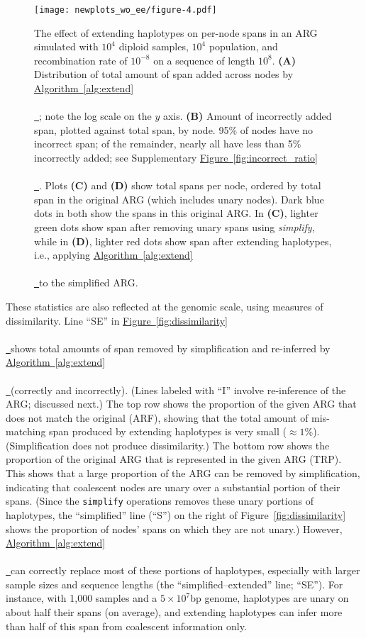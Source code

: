 \documentclass[10pt,twoside,lineno]{gsajnl}
\newcommand{\algorithmref}[2][]{%
	\hyperref[{#2}]{%
		Algorithm~\ref*{#2}%
		\ifx\\#1\\%
		\else
		\,#1%
		\fi
	}%
}
\newcommand*{\figref}[2][]{%
	\hyperref[{#2}]{%
		Figure~\ref*{#2}%
		\ifx\\#1\\%
		\else
		\,#1%
		\fi
	}%
}
\begin{document}
\begin{figure}[!bht]
	\texttt{[image: newplots\_wo\_ee/figure-4.pdf]}
	\caption{
        The effect of extending haplotypes on per-node spans
        in an ARG simulated with $10^4$ diploid samples, $10^4$ population, and 
        recombination rate of $10^{-8}$ on a sequence of length $10^8$.
        \textbf{(A)}
        Distribution of total amount of span added across nodes by \algorithmref{alg:extend};
        note the log scale on the $y$ axis.
        \textbf{(B)}
        Amount of incorrectly added span, plotted against total span, by node.
        95\% of nodes have no incorrect span; of the remainder,
        nearly all have less than 5\% incorrectly added;
        see Supplementary \figref{fig:incorrect_ratio}.
        Plots \textbf{(C)} and \textbf{(D)} show total spans per node,
        ordered by total span in the original ARG (which includes unary nodes).
        Dark blue dots in both show the spans in this original ARG.
        In \textbf{(C)}, lighter green dots show
        span after removing unary spans using \textit{simplify},
        while in \textbf{(D)},
        lighter red dots show span after extending haplotypes,
        i.e., applying \algorithmref{alg:extend} to the simplified ARG.
    }
	\label{fig:node-spans}
\end{figure}

These statistics are also reflected at the genomic scale, using measures of dissimilarity.
Line ``SE'' in \figref{fig:dissimilarity} shows total amounts of span removed by simplification
and re-inferred by \algorithmref{alg:extend} (correctly and incorrectly).
(Lines labeled with ``I'' involve re-inference of the ARG; discussed next.)
The top row shows the proportion of the given ARG that does not match the original (ARF),
showing that the total amount of mis-matching span
produced by extending haplotypes is very small ($\approx 1\%$).
(Simplification does not produce dissimilarity.)
The bottom row shows the proportion of the original ARG that is represented in the given ARG (TRP).
This shows that a large proportion of the ARG can be removed by simplification,
indicating that coalescent nodes are unary
over a substantial portion of their spans.
(Since the \texttt{simplify} operations removes these unary portions of haplotypes,
the ``simplified'' line (``S'') on the right of Figure~\ref{fig:dissimilarity} shows
the proportion of nodes' spans on which they are not unary.)
However, \algorithmref{alg:extend} can correctly replace most of these portions of haplotypes,
especially with larger sample sizes and sequence lengths
(the ``simplified--extended'' line; ``SE'').
For instance, with 1,000 samples and a $5 \times 10^7$bp genome,
haplotypes are unary on about half their spans (on average),
and extending haplotypes can infer more than half of this span from coalescent information only.
\end{document}
